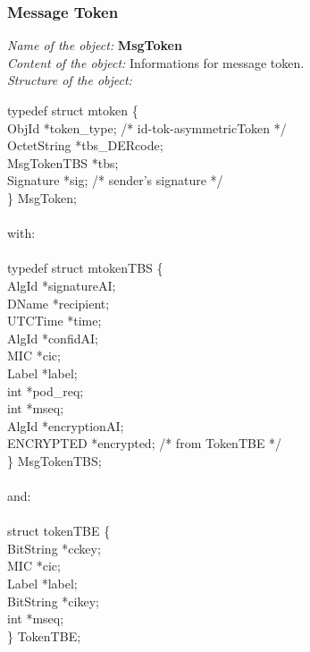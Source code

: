 \subsubsection{Message Token}
\label{x4_MTOC}
{\em Name of the object:} {\bf MsgToken} \\
{\em Content of the object:} Informations for message token. \\
{\em Structure of the object:}

{\small
\btab
\1 typedef struct mtoken \{ \\
\2      ObjId \2  *token\_type; /* id-tok-asymmetricToken */ \\
\2      OctetString \2  *tbs\_DERcode; \\
\2      MsgTokenTBS \2  *tbs; \\
\2      Signature \2    *sig; /* sender's signature */ \\
\1 \} MsgToken; \\ \\
with: \\ \\
\1 typedef struct mtokenTBS \{  \\
\2     AlgId     \2   *signatureAI; \\
\2     DName      \2   *recipient;   \\
\2     UTCTime   \2   *time;        \\
\2     AlgId     \2   *confidAI;    \\
\2     MIC       \2   *cic;         \\
\2     Label     \2   *label;       \\
\2     int       \2   *pod\_req;    \\
\2     int       \2   *mseq;        \\
\2     AlgId     \2   *encryptionAI;\\
\2     ENCRYPTED \2   *encrypted; /* from TokenTBE */  \\
\1 \} MsgTokenTBS; \\ \\
and: \\ \\
\1 struct tokenTBE \{ \\
\2     BitString \2   *cckey; \\
\2     MIC       \2   *cic;   \\
\2     Label     \2   *label; \\
\2     BitString \2   *cikey; \\
\2     int       \2   *mseq;  \\
\1 \} TokenTBE; \\
\etab
}

